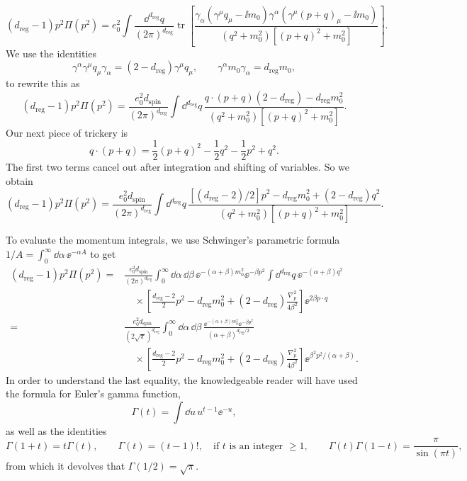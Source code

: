 \[
  (d_{\mathrm{reg}}-1)p^2\Pi(p^2)=e_0^2\int\frac{\dd^{d_{\mathrm{reg}}}q}{(2\pi)^{d_{\mathrm{reg}}}}
  \operatorname{tr}\!\left[
  \frac{\gamma_\alpha(\gamma^\mu q_\mu-\ii m_0)\gamma^\alpha
  (\gamma^\mu(p+q)_\mu-\ii m_0)}
  {(q^2+m_0^2)[(p+q)^2+m_0^2]}\right].
\]
We use the identities
\[
  \gamma^\alpha\gamma^\mu q_\mu\gamma_\alpha=(2-d_{\mathrm{reg}})\gamma^\mu q_\mu,
  \qquad
  \gamma^\alpha m_0\gamma_\alpha=d_{\mathrm{reg}}m_0,
\]
to rewrite this as
\[
  (d_{\mathrm{reg}}-1)p^2\Pi(p^2)=\frac{e_0^2d_{\mathrm{spin}}}{(2\pi)^{d_{\mathrm{reg}}}}
  \int\dd^{d_{\mathrm{reg}}}q\,
  \frac{q\mathbin{\cdot}(p+q)(2-d_{\mathrm{reg}})-d_{\mathrm{reg}}m_0^2}
  {(q^2+m_0^2)[(p+q)^2+m_0^2]}.
\]
Our next piece of trickery is
\[
  q\mathbin{\cdot}(p+q)=\frac{1}{2}(p+q)^2-\frac{1}{2}q^2-\frac{1}{2}p^2+q^2.
\]
The first two terms cancel out after integration and shifting of variables. So
we obtain
\[
  (d_{\mathrm{reg}}-1)p^2\Pi(p^2)=\frac{e_0^2d_{\mathrm{spin}}}{(2\pi)^{d_{\mathrm{reg}}}}
  \int\dd^{d_{\mathrm{reg}}}q\,
  \frac{[(d_{\mathrm{reg}}-2)/2]p^2-d_{\mathrm{reg}}m_0^2+(2-d_{\mathrm{reg}})q^2}
  {(q^2+m_0^2)[(p+q)^2+m_0^2]}.
\]

To evaluate the momentum integrals, we use Schwinger's parametric formula
$1/A=\int_0^\infty\dd\alpha\,\ee^{-\alpha A}$ to get
\[
\begin{aligned}
 (d_{\mathrm{reg}}-1)p^2\Pi(p^2)={}&\frac{e_0^2d_{\mathrm{spin}}}{(2\pi)^{d_{\mathrm{reg}}}}
 \int_0^\infty\dd\alpha\,\dd\beta\,
 \ee^{-(\alpha+\beta)m_0^2}\ee^{-\beta p^2}
 \int\dd^{d_{\mathrm{reg}}}q\,\ee^{-(\alpha+\beta)q^2}\\[-2pt]
 &\quad\times\left[\frac{d_{\mathrm{reg}}-2}{2}p^2-d_{\mathrm{reg}}m_0^2
 +(2-d_{\mathrm{reg}})\frac{\nabla_p^2}{4\beta^2}\right]
 \ee^{2\beta p\mathbin{\cdot}q}\\[2pt]
={}&\frac{e_0^2d_{\mathrm{spin}}}{(2\sqrt\pi)^{d_{\mathrm{reg}}}}
 \int_0^\infty\dd\alpha\,\dd\beta\,
 \frac{\ee^{-(\alpha+\beta)m_0^2}\ee^{-\beta p^2}}
 {(\alpha+\beta)^{d_{\mathrm{reg}}/2}}\\[-2pt]
 &\quad\times\left[\frac{d_{\mathrm{reg}}-2}{2}p^2-d_{\mathrm{reg}}m_0^2
 +(2-d_{\mathrm{reg}})\frac{\nabla_p^2}{4\beta^2}\right]
 \ee^{\beta^2p^2/(\alpha+\beta)}.
\end{aligned}
\]
In order to understand the last equality, the knowledgeable reader will have
used the formula for Euler's gamma function,
\[
  \Gamma(t)=\int\dd u\,u^{t-1}\ee^{-u},
\]
as well as the identities
\[
  \Gamma(1+t)=t\Gamma(t),\qquad
  \Gamma(t)=(t-1)!,\quad\text{if $t$ is an integer $\geq1$},
  \qquad
  \Gamma(t)\Gamma(1-t)=\frac{\pi}{\sin(\pi t)},
\]
from which it devolves that $\Gamma(1/2)=\sqrt\pi$.

